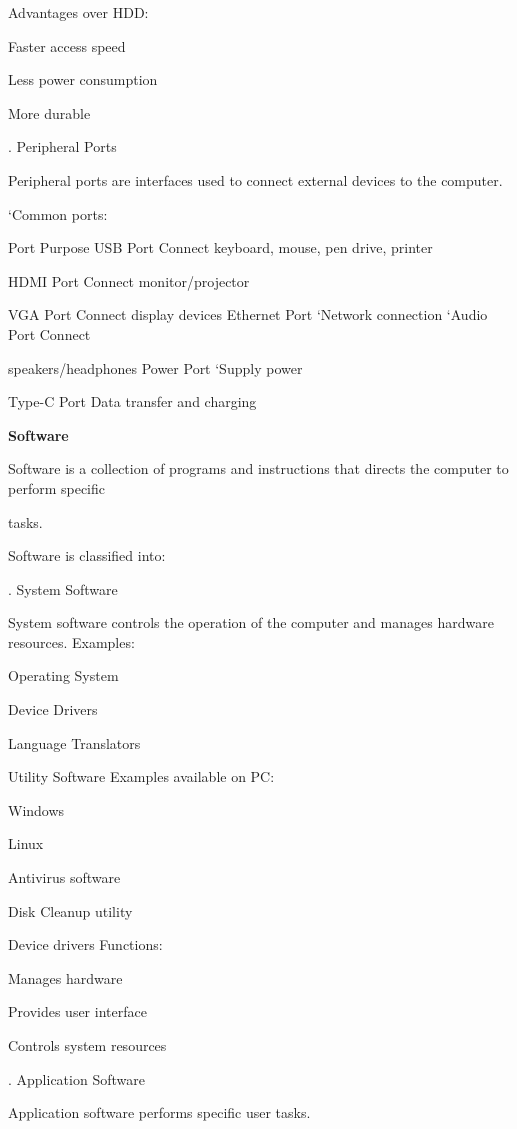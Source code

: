 \documentclass[10pt,a4paper]{article}
\begin{document}
\noindent Advantages over HDD:\par
\noindent\textbullet\; Faster access speed\par
\noindent\textbullet\; Less power consumption\par
\noindent\textbullet\; More durable\par
{}. Peripheral Ports\par
\noindent Peripheral ports are interfaces used to connect external devices to the computer.\par

\noindent ‘Common ports:\par
\noindent Port Purpose USB Port Connect keyboard, mouse, pen drive, printer\par
\noindent HDMI Port Connect monitor/projector\par
\noindent VGA Port Connect display devices Ethernet Port ‘Network connection ‘Audio Port Connect\par
\noindent speakers/headphones Power Port ‘Supply power\par
\noindent Type-C Port Data transfer and charging\par

\medskip\noindent\textbf{Software}\par
\noindent Software is a collection of programs and instructions that directs the computer to perform specific\par
\noindent tasks.\par

\noindent Software is classified into:\par
{}. System Software\par
\noindent System software controls the operation of the computer and manages hardware resources. Examples:\par
\noindent\textbullet\; Operating System\par
\noindent\textbullet\; Device Drivers\par
\noindent\textbullet\; Language Translators\par
\noindent\textbullet\; Utility Software Examples available on PC:\par
\noindent\textbullet\; Windows\par
\noindent\textbullet\; Linux\par
\noindent\textbullet\; Antivirus software\par
\noindent\textbullet\; Disk Cleanup utility\par
\noindent\textbullet\; Device drivers Functions:\par
\noindent\textbullet\; Manages hardware\par
\noindent\textbullet\; Provides user interface\par
\noindent\textbullet\; Controls system resources\par
{}. Application Software\par
\noindent Application software performs specific user tasks.\par
\end{document}
